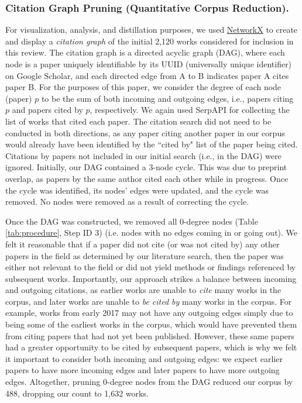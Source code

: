 \documentclass[manuscript,screen,review]{acmart}
\begin{document}
\subsubsection{Citation Graph Pruning (Quantitative Corpus Reduction).}\label{subsubsec:cgp}



For visualization, analysis, and distillation purposes, we used \href{https://networkx.org/}{NetworkX} to create and display a \textit{citation graph} of the initial 2,120 works considered for inclusion in this review. The citation graph is a directed acyclic graph (DAG), where each node is a paper uniquely identifiable by its UUID (universally unique identifier) on Google Scholar, and each directed edge from A to B indicates paper A cites paper B. For the purposes of this paper, we consider the degree of each node (paper) $p$ to be the sum of both incoming and outgoing edges, i.e., papers citing $p$ and papers cited by $p$, respectively. We again used SerpAPI for collecting the list of works that cited each paper. The citation search did not need to be conducted in both directions, as any paper citing another paper in our corpus would already have been identified by the ``cited by" list of the paper being cited. Citations by papers not included in our initial search (i.e., in the DAG) were ignored. Initially, our DAG contained a 3-node cycle. This was due to preprint overlap, as papers by the same author cited each other while in progress. Once the cycle was identified, its nodes' edges were updated, and the cycle was removed. No nodes were removed as a result of correcting the cycle.

Once the DAG was constructed, we removed all 0-degree nodes (Table \ref{tab:procedure}, Step ID 3) (i.e. nodes with no edges coming in or going out). We felt it reasonable that if a paper did not cite (or was not cited by) any other papers in the field as determined by our literature search, then the paper was either not relevant to the field or did not yield methods or findings referenced by subsequent works. Importantly, our approach strikes a balance between incoming and outgoing citations, as earlier works are unable to \textit{cite} many works in the corpus, and later works are unable to \textit{be cited by} many works in the corpus. For example, works from early 2017 may not have any outgoing edges simply due to being some of the earliest works in the corpus, which would have prevented them from citing papers that had not yet been published. However, these same papers had a greater opportunity to be cited by subsequent papers, which is why we felt it important to consider both incoming and outgoing edges: we expect earlier papers to have more incoming edges and later papers to have more outgoing edges. Altogether, pruning 0-degree nodes from the DAG reduced our corpus by 488, dropping our count to 1,632 works.
\end{document}
